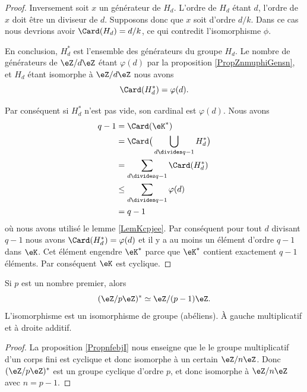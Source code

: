 \begin{proof}
    Inversement soit \( x\) un générateur de \( H_d\). L'ordre de \( H_d\) étant \( d\), l'ordre de \( x\) doit être un diviseur de \( d\). Supposons donc que \( x\) soit d'ordre \( d/k\). Dans ce cas nous devrions avoir \( \Card(H_d)=d/k\), ce qui contredit l'isomorphisme \( \phi\).

    En conclusion, \( H^*_d\) est l'ensemble des générateurs du groupe \( H_d\). Le nombre de générateurs de \( \eZ/d\eZ\) étant \( \varphi(d)\) par la proposition \ref{PropZnmuphiGensn}, et \( H_d\) étant isomorphe à \( \eZ/d\eZ\) nous avons
    \begin{equation}
        \Card(H^*_d)=\varphi(d).
    \end{equation}
    
    Par conséquent si \( H^*_d\) n'est pas vide, son cardinal est \( \varphi(d)\). Nous avons 
    \begin{subequations}
        \begin{align}
            q-1&=\Card(\eK^*)\\
            &=\Card\big( \bigcup_{d\divides q-1}H^*_d \big)\\
            &=\sum_{d\divides q-1}\Card(H^*_d)\\
            &\leq \sum_{d\divides q-1}\varphi(d)\\
            &=q-1
        \end{align}
    \end{subequations}
    où nous avons utilisé le lemme \ref{LemKcpjee}. Par conséquent pour tout \( d\) divisant \( q-1\) nous avons \( \Card(H^*_d)=\varphi(d)\) et il y a au moins un élément d'ordre \( q-1\) dans \( \eK\). Cet élément engendre \( \eK^*\) parce que \( \eK^*\) contient exactement \( q-1\) éléments. Par conséquent \( \eK\) est cyclique.
\end{proof}

\begin{corollary}   \label{CorpRUndR}
    Si \( p\) est un nombre premier, alors 
    \begin{equation}
        (\eZ/p\eZ)^*\simeq\eZ/(p-1)\eZ.
    \end{equation}
    L'isomorphisme est un isomorphisme de groupe (abéliens). À gauche multiplicatif et à droite additif.
\end{corollary}

\begin{proof}
    La proposition \ref{PropnfebjI} nous enseigne que le le groupe multiplicatif d'un corps fini est cyclique et donc isomorphe à un certain \( \eZ/n\eZ\). Donc \( (\eZ/p\eZ)^*\) est un groupe cyclique d'ordre \( p\), et donc isomorphe à \( \eZ/n\eZ\) avec \( n=p-1\).
\end{proof}

